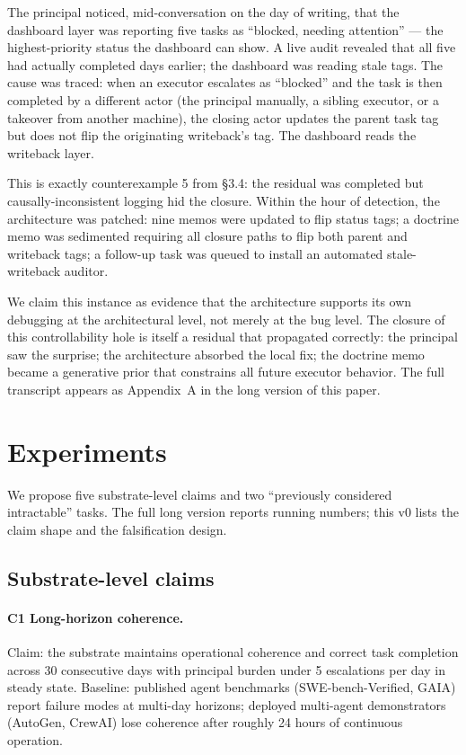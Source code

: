 \documentclass[11pt]{article}
\begin{document}
The principal noticed, mid-conversation on the day of writing, that the dashboard layer was reporting five tasks as ``blocked, needing attention'' --- the highest-priority status the dashboard can show. A live audit revealed that all five had actually completed days earlier; the dashboard was reading stale tags. The cause was traced: when an executor escalates as ``blocked'' and the task is then completed by a different actor (the principal manually, a sibling executor, or a takeover from another machine), the closing actor updates the parent task tag but does not flip the originating writeback's tag. The dashboard reads the writeback layer.

This is exactly counterexample 5 from §3.4: the residual was completed but causally-inconsistent logging hid the closure. Within the hour of detection, the architecture was patched: nine memos were updated to flip status tags; a doctrine memo was sedimented requiring all closure paths to flip both parent and writeback tags; a follow-up task was queued to install an automated stale-writeback auditor.

We claim this instance as evidence that the architecture supports its own debugging at the architectural level, not merely at the bug level. The closure of this controllability hole is itself a residual that propagated correctly: the principal saw the surprise; the architecture absorbed the local fix; the doctrine memo became a generative prior that constrains all future executor behavior. The full transcript appears as Appendix~A in the long version of this paper.

\section{Experiments}

We propose five substrate-level claims and two ``previously considered intractable'' tasks. The full long version reports running numbers; this v0 lists the claim shape and the falsification design.

\subsection{Substrate-level claims}

\paragraph{C1 Long-horizon coherence.}
Claim: the substrate maintains operational coherence and correct task completion across 30 consecutive days with principal burden under 5 escalations per day in steady state. Baseline: published agent benchmarks (SWE-bench-Verified, GAIA) report failure modes at multi-day horizons; deployed multi-agent demonstrators (AutoGen, CrewAI) lose coherence after roughly 24 hours of continuous operation.
\end{document}

